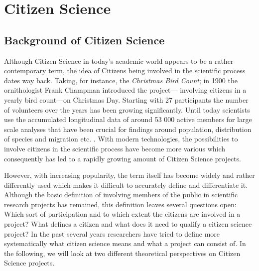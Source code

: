 \section{Citizen Science}
\label{sec:Theory_CS}
\subsection{Background of Citizen Science}
\label{ssec:Background_CS}
Although Citizen Science in today’s academic world appears to be a rather contemporary term, the idea of Citizens being involved in the scientific process dates way back. Taking, for instance, the \textit{Christmas Bird Count}; in 1900 the ornithologist Frank Champman introduced the project--- involving citizens in a yearly bird count---on Christmas Day. Starting with 27 participants the number of volunteers over the years has been growing significantly. Until today scientists use the accumulated longitudinal data of around 53 000 active members for large scale analyses that have been crucial for findings around population, distribution of species and migration etc. \parencite{Lebaron2017}. With modern technologies, the possibilities to involve citizens in the scientific process have become more various which consequently has led to a rapidly growing amount of Citizen Science projects. 

However, with increasing popularity, the term itself has become widely and rather differently used which makes it difficult to accurately define and differentiate it. Although the basic definition of involving members of the public in scientific research projects has remained, this definition leaves several questions open: Which sort of participation and to which extent the citizens are involved in a project? What defines a citizen and what does it need to qualify a citizen science project? In the past several years researchers have tried to define more systematically what citizen science means and what a  project can consist of. In the following, we will look at two  different theoretical perspectives on Citizen Science projects. 



